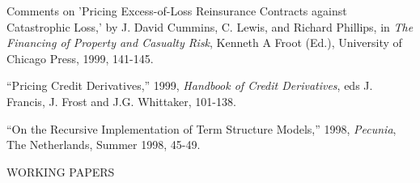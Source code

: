 \documentclass{article}
\begin{document}
\begin{etaremune}
\item
Comments on 'Pricing Excess-of-Loss Reinsurance Contracts against
Catastrophic Loss,' by J. David Cummins, C. Lewis, and Richard Phillips,
in {\it The Financing of Property and Casualty Risk}, Kenneth A
Froot (Ed.), University of Chicago Press, 1999, 141-145. 

\item ``Pricing Credit Derivatives,'' 1999, {\it Handbook of Credit
Derivatives}, eds J. Francis, J. Frost and J.G. Whittaker, 101-138.



\item
``On the Recursive Implementation of Term Structure Models,'' 
1998, {\it Pecunia}, The Netherlands, Summer 1998, 45-49.


\end{etaremune}





\begin{description}
\item[WORKING PAPERS] \mbox{}
\end{description}
\end{document}
